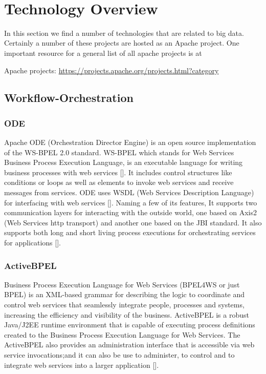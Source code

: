 \FILENAME\

\chapter{Technology Overview}
\label{S:BD-tech}


In this section we find a number of technologies that are related to
big data. Certainly a number of these projects are hosted as an Apache
project. One important resource for a general list of all apache
projects is at


Apache projects: \url{https://projects.apache.org/projects.html?category}


\section{Workflow-Orchestration}
\label{S:o-workflow}

\subsection{ODE}

Apache ODE (Orchestration Director Engine) is an open source
implementation of the WS-BPEL 2.0 standard. WS-BPEL which stands for
Web Services Business Process Execution Language, is an executable
language for writing business processes with web
services [\cite{www-bpel-wiki}].  It includes control structures like
conditions or loops as well as elements to invoke web services and
receive messages from services.  ODE uses WSDL (Web Services
Description Language) for interfacing with web
services [\cite{www-ode-wiki}]. Naming a few of its features, It
supports two communication layers for interacting with the outside
world, one based on Axis2 (Web Services http transport) and another
one based on the JBI standard. It also supports both long and short
living process executions for orchestrating services for
applications [\cite{www-ode-web}].

\subsection{ActiveBPEL}

Business Process Execution Language for Web Services (BPEL4WS or just
BPEL) is an XML-based grammar for describing the logic to coordinate
and control web services that seamlessly integrate people, processes
and systems, increasing the efficiency and visibility of the
business. ActiveBPEL is a robust Java/J2EE runtime environment that is
capable of executing process definitions created to the Business
Process Execution Language for Web Services. The ActiveBPEL also
provides an administration interface that is accessible via web
service invocations;and it can also be use to administer, to control
and to integrate web services into a larger
application [\cite{www-bpel}].


